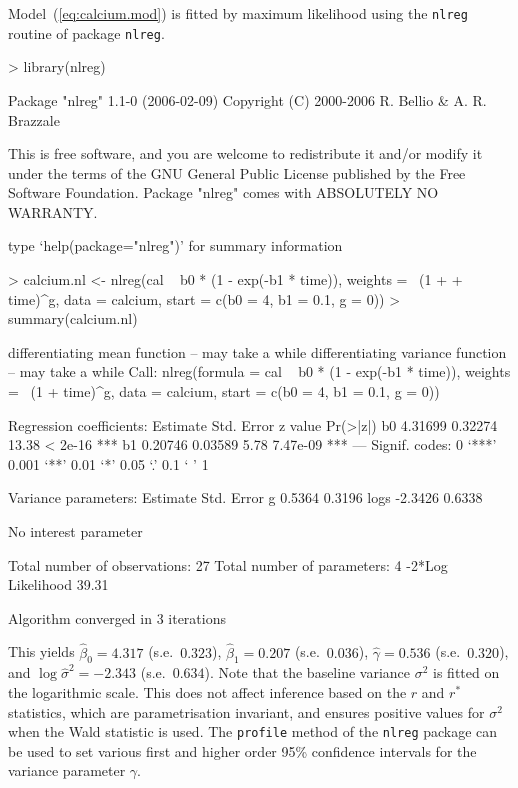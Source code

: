 \documentclass[a4paper,11pt]{article}
\def\code{\texttt}
\begin{document}
Model~(\ref{eq:calcium.mod}) is fitted by maximum likelihood using the \code{nlreg} routine of package \code{nlreg}.
%
\begin{Schunk}
\begin{Sinput}
> library(nlreg)
\end{Sinput}
\begin{Soutput}
   Package "nlreg" 1.1-0 (2006-02-09) 
   Copyright (C) 2000-2006 R. Bellio & A. R. Brazzale

This is free software, and you are welcome to redistribute
it and/or modify it under the terms of the GNU General
Public License published by the Free Software Foundation.
Package "nlreg" comes with ABSOLUTELY NO WARRANTY.

type `help(package="nlreg")' for summary information
\end{Soutput}
\begin{Sinput}
> calcium.nl <- nlreg(cal ~ b0 * (1 - exp(-b1 * time)), weights = ~(1 + 
+     time)^g, data = calcium, start = c(b0 = 4, b1 = 0.1, g = 0))
> summary(calcium.nl)
\end{Sinput}
\begin{Soutput}
differentiating mean function -- may take a while
differentiating variance function -- may take a while
Call: 
nlreg(formula = cal ~ b0 * (1 - exp(-b1 * time)), weights = ~(1 + 
    time)^g, data = calcium, start = c(b0 = 4, b1 = 0.1, g = 0))

Regression coefficients:
   Estimate Std. Error z value Pr(>|z|)    
b0  4.31699    0.32274   13.38  < 2e-16 ***
b1  0.20746    0.03589    5.78 7.47e-09 ***
---
Signif. codes:  0 ‘***’ 0.001 ‘**’ 0.01 ‘*’ 0.05 ‘.’ 0.1 ‘ ’ 1 

Variance parameters:
     Estimate Std. Error
g      0.5364     0.3196
logs  -2.3426     0.6338

No interest parameter

Total number of observations: 27
Total number of parameters: 4
-2*Log Likelihood 39.31 

Algorithm converged in 3 iterations
\end{Soutput}
\end{Schunk}
%
This yields $\hat\beta_0 = 4.317$ (s.e.\ $0.323$), $\hat\beta_1 = 0.207$ (s.e.\ $0.036$), $\hat\gamma = 0.536$ (s.e.\ $0.320$), and $\log\hat\sigma^2 = -2.343$ (s.e.\ $0.634$).  Note that the baseline variance $\sigma^2$ is fitted on the logarithmic scale.  This does not affect inference based on the $r$ and $r^*$ statistics, which are parametrisation invariant, and ensures positive values for $\sigma^2$ when the Wald statistic is used.  The \code{profile} method of the \code{nlreg} package can be used to set various first and higher order 95\% confidence intervals for the variance parameter $\gamma$.
\end{document}
